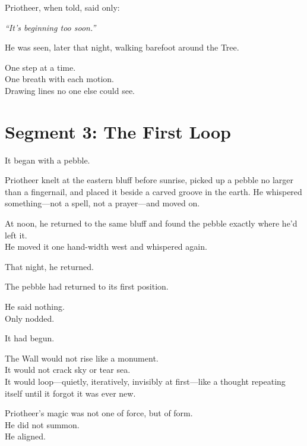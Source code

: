 \documentclass[9pt]{article}
\begin{document}
\vspace{0.5em}
Priotheer, when told, said only:

\vspace{0.5em}
\textit{``It’s beginning too soon.''}

\vspace{0.5em}
He was seen, later that night, walking barefoot around the Tree.

\vspace{0.5em}
One step at a time.\\
One breath with each motion.\\
Drawing lines no one else could see.

\newpage

\section*{Segment 3: The First Loop}

It began with a pebble.

\vspace{0.5em}
Priotheer knelt at the eastern bluff before sunrise, picked up a pebble no larger than a fingernail, and placed it beside a carved groove in the earth. He whispered something---not a spell, not a prayer---and moved on.

\vspace{0.5em}
At noon, he returned to the same bluff and found the pebble exactly where he’d left it.\\
He moved it one hand-width west and whispered again.

\vspace{0.5em}
That night, he returned.

\vspace{0.5em}
The pebble had returned to its first position.

\vspace{0.5em}
He said nothing.\\
Only nodded.

\vspace{0.5em}
It had begun.

\vspace{0.5em}
The Wall would not rise like a monument.\\
It would not crack sky or tear sea.\\
It would loop---quietly, iteratively, invisibly at first---like a thought repeating itself until it forgot it was ever new.

\vspace{0.5em}
Priotheer’s magic was not one of force, but of form.\\
He did not summon.\\
He aligned.
\end{document}
